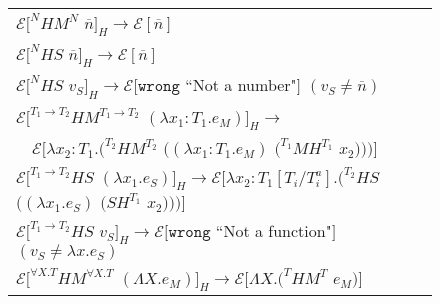 \begin{figure}[ph!]
\centering
\begin{tabular}{l}
\vspace{5pt}

$\mathscr{E}[^{N}HM^{N}$ $\overline{n}]_{H}\rightarrow\mathscr{E}[\overline{n}]$ \\

\vspace{5pt}

$\mathscr{E}[^{N}HS$ $\overline{n}]_{H}\rightarrow\mathscr{E}[\overline{n}]$ \\

\vspace{5pt}

$\mathscr{E}[^{N}HS$ $v_{S}]_{H}\rightarrow\mathscr{E}[\mathtt{wrong}$ ``Not a number"$]$ $(v_{S}\neq\overline{n})$ \\

\vspace{5pt}

$\mathscr{E}[^{T_{1}\rightarrow T_{2}}HM^{T_{1}\rightarrow T_{2}}$ $(\lambda x_{1}:T_{1}.e_{M})]_{H}\rightarrow$ \\

\vspace{5pt}

$\quad\mathscr{E}[\lambda x_{2}:T_{1}.(^{T_{2}}HM^{T_{2}}$ $((\lambda x_{1}:T_{1}.e_{M})$ $(^{T_{1}}MH^{T_{1}}$ $x_{2})))]$ \\

\vspace{5pt}

$\mathscr{E}[^{T_{1}\rightarrow T_{2}}HS$ $(\lambda x_{1}.e_{S})]_{H}\rightarrow\mathscr{E}[\lambda x_{2}:T_{1}[T_{i}/T^{a}_{i}].(^{T_{2}}HS$ $((\lambda x_{1}.e_{S})$ $(SH^{T_{1}}$ $x_{2})))]$ \\

\vspace{5pt}

$\mathscr{E}[^{T_{1}\rightarrow T_{2}}HS$ $v_{S}]_{H}\rightarrow\mathscr{E}[\mathtt{wrong}$ ``Not a function"$]$ $(v_{S}\neq\lambda x.e_{S})$ \\

\vspace{5pt}

$\mathscr{E}[^{\forall X.T}HM^{\forall X.T}$ $(\Lambda X.e_{M})]_{H}\rightarrow\mathscr{E}[\Lambda X.(^{T}HM^{T}$ $e_{M})]$ \\


\end{tabular}
\end{figure}
